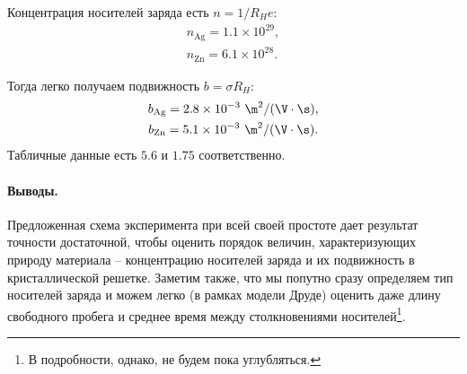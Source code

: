 \documentclass{../lab_class}
\begin{document}
Концентрация носителей заряда есть $n = 1/R_He$:
\begin{gather*}
	n_{\text{Ag}} = 1.1 \times 10^{29},\\
	n_{\text{Zn}} = 6.1 \times 10^{28}.
\end{gather*}

Тогда легко получаем подвижность $b = \sigma R_H$:
\begin{gather*}
	b_{\text{Ag}} = 2.8 \times 10^{-3} \ \m^2 / (\V \cdot \s), \\
	b_{\text{Zn}} = 5.1 \times 10^{-3} \ \m^2 / (\V \cdot \s).	
\end{gather*}
Табличные данные есть $5.6$ и $1.75$ соответственно.

\paragraph{Выводы.}
Предложенная схема эксперимента при всей своей простоте дает результат точности достаточной, чтобы оценить порядок величин, характеризующих природу материала -- концентрацию носителей заряда и их подвижность в кристаллической решетке. Заметим также, что мы попутно сразу определяем тип носителей заряда и можем легко (в рамках модели Друде) оценить даже длину свободного пробега и среднее время между столкновениями носителей\footnote{В подробности, однако, не будем пока углубляться.}. 
\end{document}
